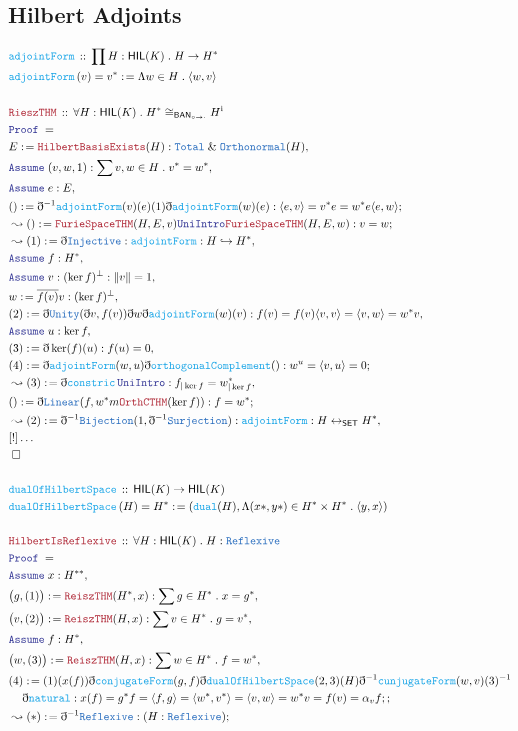 \documentclass[12pt]{scrartcl}
\newcommand{\TYPE}[1]{\textcolor{NavyBlue}{\mathtt{#1}}}
\newcommand{\FUNC}[1]{\textcolor{Cerulean}{\mathtt{#1}}}
\newcommand{\LOGIC}[1]{\textcolor{Blue}{\mathtt{#1}}}
\newcommand{\THM}[1]{\textcolor{Maroon}{\mathtt{#1}}}
\renewcommand{\.}{\; . \;}
\newcommand{\de}{: \kern 0.1pc =}
\newcommand{\Act}[1]{\left( #1 \right)}
\newcommand{\Theorem}[2]{& \THM{#1} \, :: \, #2 \\ & \Proof = \\ }
\newcommand{\DeclareFunc}[2]{& \FUNC{#1} \, :: \, #2 \\}
\newcommand{\DefineNamedFunc}[4]{&  \FUNC{#1}\Act{#2} = #3 \de #4 \\}
\newcommand{\NewLine}{\\ & \kern 1pc}
\newcommand{\Page}[1]{\begin{align*} #1 \end{align*} \newpage   }
\newcommand{ \bd }{ \ByDef }
\renewcommand{\And}{\; \& \;}
\newcommand{\ToInj}{\hookrightarrow}
\newcommand{\ToBij}{\leftrightarrow}
\newcommand{\Say}[3]{& #1 \de #2 : #3, \\}
\newcommand{\Conclude}[3]{& #1 \de #2 : #3; \\}
\newcommand{\Derive}[3]{& \leadsto #1 \de #2 : #3, \\}
\newcommand{\DeriveConclude}[3]{& \leadsto #1 \de #2 : #3 ; \\}
\newcommand{\A}{\LOGIC{Assume} \;}
\newcommand{\Assume}[2]{& \A #1 : #2, \\}
\newcommand{\QED}{\; \square}
\newcommand{\EndProof}{& \QED \\}
\newcommand{\ByDef}{\eth}
\newcommand{\Proof}{\LOGIC{Proof} \; }
\newcommand{\BANI}{{\textsf{BAN}_{\circ \to \cdot}}}
\newcommand{\HIL}{\textsf{HIL}}
\begin{document}
\subsection{Hilbert Adjoints}
\Page{
\DeclareFunc{adjointForm}{\prod H : \HIL(K) \. H \to H^*}
\DefineNamedFunc{adjointForm}{v}{v^*}{ \Lambda w \in H \. \langle w, v \rangle}
\\
\Theorem{RieszTHM}{\forall H : \HIL(K) \. H^* \cong_\BANI H^{\mathrm{i}}}
\Say{E}{\THM{HilbertBasisExists}(H)}{\TYPE{Total} \And  \TYPE{Orthonormal}(H)}
\Assume{(v,w,1)}{\sum v,w \in H \. v^* = w^*}
\Assume{e}{E}
\Conclude{()}{\bd^{-1} \FUNC{adjointForm}(v)(e)(1)\bd \FUNC{adjointForm}(w)(e)}{\langle e , v \rangle = v^*e = w^*e \langle e, w \rangle}
\DeriveConclude{()}{\THM{FurieSpaceTHM}(H,E,v)\LOGIC{UniIntro}\THM{FurieSpaceTHM}(H,E,w)}{v = w}
\Derive{(1)}{\bd \TYPE{Injective}}{\FUNC{adjointForm} : H \ToInj H^*}
\Assume{f}{H^*}
\Assume{v}{ (\ker f)^\bot : \| v \| = 1}
\Say{w}{\overline{f(v)}v}{ (\ker f)^\bot }
\Say{(2)}{\bd\TYPE{Unity}(\bd v, f(v))\bd w \bd\FUNC{adjointForm}(w)(v) }{f(v) = f(v)\langle v, v \rangle = \langle v, w \rangle = w^*v}
\Assume{u}{\ker f}
\Say{(3)}{\bd \ker(f)(u)}{f(u) = 0}
\Conclude{(4)}{\bd \FUNC{adjointForm}(w,u)\bd \FUNC{orthogonalComplement}()}
{w^ u = \langle v, u \rangle = 0}
\Derive{(3)}{\bd \FUNC{constric} \, \LOGIC{UniIntro}}{f_{|\ker f} = w^*_{|\ker f}}
\Conclude{()}{\bd \TYPE{Linear}(f,w^*m\THM{OrthCTHM}(\ker f))}{f = w^*}
\Derive{(2)}{\bd^{-1}\TYPE{Bijection}(1,\bd^{-1}\TYPE{Surjection})}{\FUNC{adjointForm}: H \ToBij_\mathsf{SET} H^*}
& [!]\ldots \\
\EndProof
\\
\DeclareFunc{dualOfHilbertSpace}{\HIL(K) \to \HIL(K)}
\DefineNamedFunc{dualOfHilbertSpace}{H}{H^*}{(\FUNC{dual}(H), \Lambda (x*,y*) \in H^* \times H^* 
\. \langle y,  x \rangle
)}
\\
\Theorem{HilbertIsReflexive}{\forall H : \HIL(K) \. H : \TYPE{Reflexive}}
\Assume{x}{H^{**}}
\Say{\big(g,(1)\big)}{\THM{ReiszTHM}(H^*,x)}{\sum g \in H^* \. x = g^*}
\Say{\big(v,(2)\big)}{\THM{ReiszTHM}(H,x)}{\sum v \in H^* \. g = v^*}
\Assume{f}{H^*}
\Say{\big(w,(3)\big)}{\THM{ReiszTHM}(H,x)}{\sum w \in H^* \. f = w^*}
\Conclude{(4)}{(1)(x(f))\bd \FUNC{conjugateForm}(g,f)\bd\FUNC{dualOfHilbertSpace}(2,3)(H) \bd^{-1}
\FUNC{cunjugateForm}(w,v)(3)^{-1} \NewLine \bd \FUNC{natural}}{ x(f) = g^* f = \langle f, g \rangle = \langle w^*, v^* \rangle =
 \langle v, w \rangle =  w^* v = f(v) = \alpha_v f ; }
\DeriveConclude{(*)}{\bd^{-1} \TYPE{Reflexive}}{(H : \TYPE{Reflexive})}
}
\end{document}

